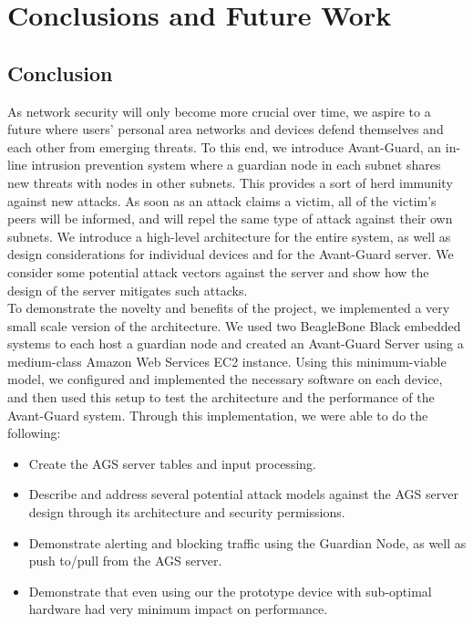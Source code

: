 \section{Conclusions and Future Work}
\label{sec:concl}

\subsection{Conclusion}
\label{sec:concl:main}
As network security will only become more crucial over time, we aspire to a future where users' personal area networks and devices defend themselves and each other from emerging threats. To this end, we introduce Avant-Guard, an in-line intrusion prevention system where a guardian node in each subnet shares new threats with nodes in other subnets. This provides a sort of herd immunity against new attacks. As soon as an attack claims a victim, all of the victim's peers will be informed, and will repel the same type of attack against their own subnets. We introduce a high-level architecture for the entire system, as well as design considerations for individual devices and for the Avant-Guard server. We consider some potential attack vectors against the server and show how the design of the server mitigates such attacks.  \\
To demonstrate the novelty and benefits of the project, we implemented a very small scale version of the architecture. We used two BeagleBone Black embedded systems to each host a guardian node and created an Avant-Guard Server using a medium-class Amazon Web Services EC2 instance. Using this minimum-viable model, we configured and implemented the necessary software on each device, and then used this setup to test the architecture and the performance of the Avant-Guard system. Through this implementation, we were able to do the following:

\begin{itemize}
    \item Create the AGS server tables and input processing.
    \item Describe and address several potential attack models against the AGS server design through its architecture and security permissions.
    \item Demonstrate alerting and blocking traffic using the Guardian Node, as well as push to/pull from the AGS server.
    \item Demonstrate that even using our the prototype device with sub-optimal hardware had very minimum impact on performance.
\end{itemize}


